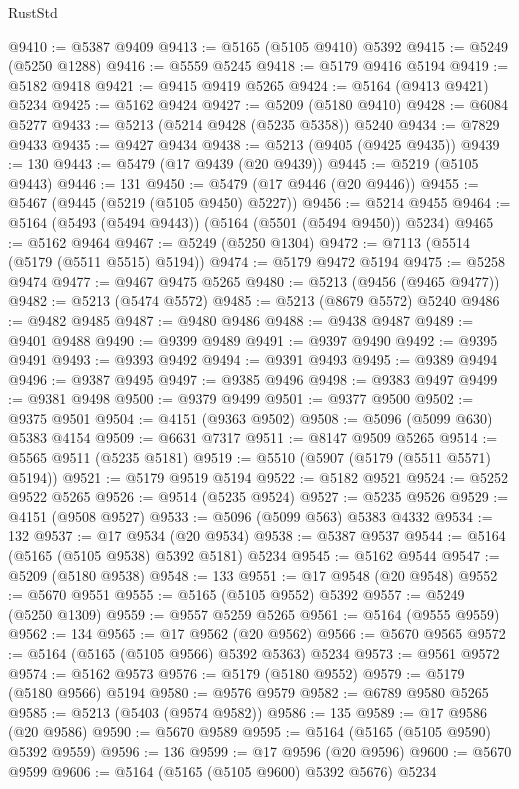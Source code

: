 \begin{lexlean}{RustStd}
\begin{coremodule}
@9410 := @5387 @9409
@9413 := @5165 (@5105 @9410) @5392
@9415 := @5249 (@5250 @1288)
@9416 := @5559 @5245
@9418 := @5179 @9416 @5194
@9419 := @5182 @9418
@9421 := @9415 @9419 @5265
@9424 := @5164 (@9413 @9421) @5234
@9425 := @5162 @9424
@9427 := @5209 (@5180 @9410)
@9428 := @6084 @5277
@9433 := @5213 (@5214 @9428 (@5235 @5358)) @5240
@9434 := @7829 @9433
@9435 := @9427 @9434
@9438 := @5213 (@9405 (@9425 @9435))
@9439 := 130
@9443 := @5479 (@17 @9439 (@20 @9439))
@9445 := @5219 (@5105 @9443)
@9446 := 131
@9450 := @5479 (@17 @9446 (@20 @9446))
@9455 := @5467 (@9445 (@5219 (@5105 @9450) @5227))
@9456 := @5214 @9455
@9464 := @5164 (@5493 (@5494 @9443)) (@5164 (@5501 (@5494 @9450)) @5234)
@9465 := @5162 @9464
@9467 := @5249 (@5250 @1304)
@9472 := @7113 (@5514 (@5179 (@5511 @5515) @5194))
@9474 := @5179 @9472 @5194
@9475 := @5258 @9474
@9477 := @9467 @9475 @5265
@9480 := @5213 (@9456 (@9465 @9477))
@9482 := @5213 (@5474 @5572)
@9485 := @5213 (@8679 @5572) @5240
@9486 := @9482 @9485
@9487 := @9480 @9486
@9488 := @9438 @9487
@9489 := @9401 @9488
@9490 := @9399 @9489
@9491 := @9397 @9490
@9492 := @9395 @9491
@9493 := @9393 @9492
@9494 := @9391 @9493
@9495 := @9389 @9494
@9496 := @9387 @9495
@9497 := @9385 @9496
@9498 := @9383 @9497
@9499 := @9381 @9498
@9500 := @9379 @9499
@9501 := @9377 @9500
@9502 := @9375 @9501
@9504 := @4151 (@9363 @9502)
@9508 := @5096 (@5099 @630) @5383 @4154
@9509 := @6631 @7317
@9511 := @8147 @9509 @5265
@9514 := @5565 @9511 (@5235 @5181)
@9519 := @5510 (@5907 (@5179 (@5511 @5571) @5194))
@9521 := @5179 @9519 @5194
@9522 := @5182 @9521
@9524 := @5252 @9522 @5265
@9526 := @9514 (@5235 @9524)
@9527 := @5235 @9526
@9529 := @4151 (@9508 @9527)
@9533 := @5096 (@5099 @563) @5383 @4332
@9534 := 132
@9537 := @17 @9534 (@20 @9534)
@9538 := @5387 @9537
@9544 := @5164 (@5165 (@5105 @9538) @5392 @5181) @5234
@9545 := @5162 @9544
@9547 := @5209 (@5180 @9538)
@9548 := 133
@9551 := @17 @9548 (@20 @9548)
@9552 := @5670 @9551
@9555 := @5165 (@5105 @9552) @5392
@9557 := @5249 (@5250 @1309)
@9559 := @9557 @5259 @5265
@9561 := @5164 (@9555 @9559)
@9562 := 134
@9565 := @17 @9562 (@20 @9562)
@9566 := @5670 @9565
@9572 := @5164 (@5165 (@5105 @9566) @5392 @5363) @5234
@9573 := @9561 @9572
@9574 := @5162 @9573
@9576 := @5179 (@5180 @9552)
@9579 := @5179 (@5180 @9566) @5194
@9580 := @9576 @9579
@9582 := @6789 @9580 @5265
@9585 := @5213 (@5403 (@9574 @9582))
@9586 := 135
@9589 := @17 @9586 (@20 @9586)
@9590 := @5670 @9589
@9595 := @5164 (@5165 (@5105 @9590) @5392 @9559)
@9596 := 136
@9599 := @17 @9596 (@20 @9596)
@9600 := @5670 @9599
@9606 := @5164 (@5165 (@5105 @9600) @5392 @5676) @5234

\end{coremodule}
\end{lexlean}
